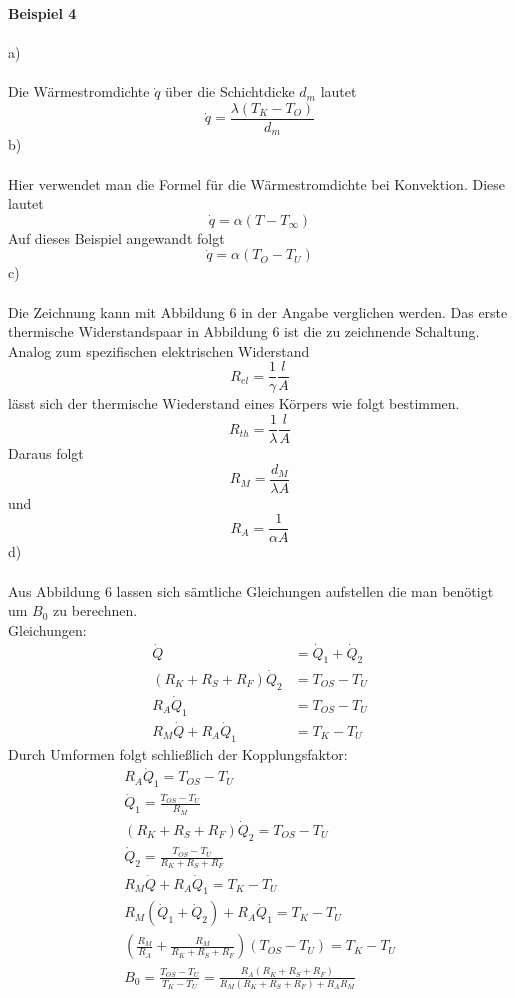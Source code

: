 \textbf{Beispiel 4} \\ \\
a) \\ \\
Die Wärmestromdichte $\dot{q}$ über die Schichtdicke $d_m$ lautet
\[
	\dot{q} = \frac{\lambda \left(T_K - T_O\right)}{d_m}
\]
b) \\ \\
Hier verwendet man die Formel für die Wärmestromdichte bei Konvektion. Diese lautet
\[
	\dot{q} = \alpha \left(T - T_\infty\right)
\]
Auf dieses Beispiel angewandt folgt
\[
	\dot{q} = \alpha \left(T_O - T_U\right)
\]
c) \\ \\
Die Zeichnung kann mit Abbildung 6 in der Angabe verglichen werden. Das erste thermische Widerstandspaar in Abbildung 6 ist die zu zeichnende Schaltung.\\
Analog zum spezifischen elektrischen Widerstand
\[
	R_{el}= \frac{1}{\gamma}\frac{l}{A}
\]
lässt sich der thermische Wiederstand eines Körpers wie folgt bestimmen.
\[
	R_{th} = \frac{1}{\lambda}\frac{l}{A}
\]
Daraus folgt
\[
	R_M = \frac{d_M}{\lambda A}
\]
und
\[
	R_A = \frac{1}{\alpha A}
\]
d) \\ \\
Aus Abbildung 6 lassen sich sämtliche Gleichungen aufstellen die man benötigt um $B_0$ zu berechnen.\\
Gleichungen:
\begin{align*}
	\dot{Q} &= \dot{Q}_1 + \dot{Q}_2 \\
	\left(R_K + R_S + R_F\right) \dot{Q}_2 &= T_{OS} - T_U \\
	R_A\dot{Q}_1 &= T_{OS} - T_U \\
	R_M\dot{Q} + R_A\dot{Q}_1 &= T_K - T_U
\end{align*}
Durch Umformen folgt schließlich der Kopplungsfaktor:
\begin{align*}
R_A\dot{Q}_1 = T_{OS} - T_U \\
	\dot{Q}_1 = \frac{T_{OS} - T_U}{R_M} \\
	\left(R_K + R_S + R_F\right) \dot{Q}_2 = T_{OS} - T_U \\
	\dot{Q}_2 = \frac{T_{OS} - T_U}{R_K + R_S + R_F} \\
	R_M\dot{Q} + R_A\dot{Q}_1 = T_K - T_U \\
	R_M\left(\dot{Q}_1 + \dot{Q}_2\right) + R_A\dot{Q}_1 = T_K - T_U \\
	\left(\frac{R_M}{R_A} + \frac{R_M}{R_K + R_S + R_F}\right)\left(T_{OS} - T_U\right) = T_K - T_U \\
	B_0 = \frac{T_{OS} - T_U}{T_K - T_U} = \frac{R_A(R_K + R_S + R_F)}{R_M(R_K + R_S + R_F) + R_AR_M}
\end{align*}